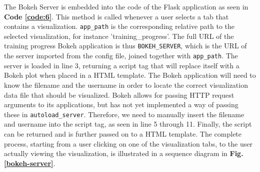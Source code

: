 \noindent The Bokeh Server is embedded into the code of the Flask application as seen in \textbf{Code \ref{code:6}}. This method is called whenever a user selects a tab that contains a visualization. \texttt{app\_path} is the corresponding relative path to the selected visualization, for instance 'training\_progress'. The full URL of the training progress Bokeh application is thus \texttt{BOKEH\_SERVER}, which is the URL of the server imported from the config file, joined together with \texttt{app\_path}. The server is loaded in line 3, returning a script tag that will replace itself with a Bokeh plot when placed in a HTML template. The Bokeh application will need to know the filename and the username in order to locate the correct visualization data file that should be visualized. Bokeh allows for passing HTTP request arguments to its applications, but has not yet implemented a way of passing these in \texttt{autoload\_server}. Therefore, we need to manually insert the filename and username into the script tag, as seen in line 5 through 11. Finally, the script can be returned and is further passed on to a HTML template. The complete process, starting from a user clicking on one of the visualization tabs, to the user actually viewing the visualization, is illustrated in a sequence diagram in \textbf{Fig. \ref{bokeh-server}}.



